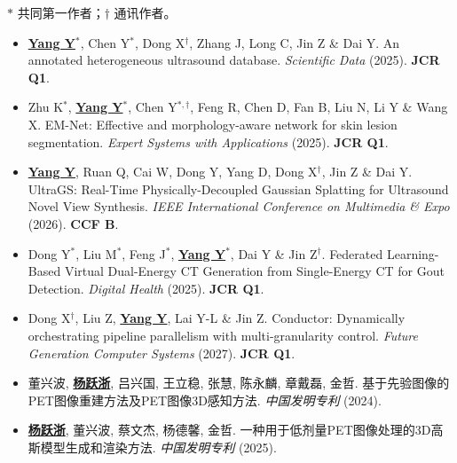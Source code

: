 %
%


{\footnotesize $*$ 共同第一作者；$\dagger$ 通讯作者。}
\begin{itemize}[leftmargin=0pt,itemsep=2pt]
\item \underline{\textbf{Yang Y$^*$}}, Chen Y$^*$, Dong X$^\dagger$, Zhang J, Long C, Jin Z \& Dai Y. An annotated heterogeneous ultrasound database. \emph{Scientific Data} (2025). \textbf{JCR Q1}.
\item Zhu K$^*$, \underline{\textbf{Yang Y$^*$}}, Chen Y$^{*,\dagger}$, Feng R, Chen D, Fan B, Liu N, Li Y \& Wang X. EM-Net: Effective and morphology-aware network for skin lesion segmentation. \emph{Expert Systems with Applications} (2025). \textbf{JCR Q1}.
\item \underline{\textbf{Yang Y}}, Ruan Q, Cai W, Dong Y, Yang D, Dong X$^\dagger$, Jin Z \& Dai Y. UltraGS: Real-Time Physically-Decoupled Gaussian Splatting for Ultrasound Novel View Synthesis. \emph{IEEE International Conference on Multimedia \& Expo} (2026). \textbf{CCF B}.
\item Dong Y$^*$, Liu M$^*$, Feng J$^*$, \underline{\textbf{Yang Y$^*$}}, Dai Y \& Jin Z$^\dagger$. Federated Learning-Based Virtual Dual-Energy CT Generation from Single-Energy CT for Gout Detection. \emph{Digital Health} (2025). \textbf{JCR Q1}.
\item Dong X$^\dagger$, Liu Z, \underline{\textbf{Yang Y}}, Lai Y-L \& Jin Z. Conductor: Dynamically orchestrating pipeline parallelism with multi-granularity control. \emph{Future Generation Computer Systems} (2027). \textbf{JCR Q1}.
\item 董兴波, \underline{\textbf{杨跃浙}}, 吕兴国, 王立稳, 张慧, 陈永麟, 章戴磊, 金哲. 基于先验图像的PET图像重建方法及PET图像3D感知方法. \emph{中国发明专利} (2024).
\item \underline{\textbf{杨跃浙}}, 董兴波, 蔡文杰, 杨德馨, 金哲. 一种用于低剂量PET图像处理的3D高斯模型生成和渲染方法. \emph{中国发明专利} (2025).
\end{itemize}
